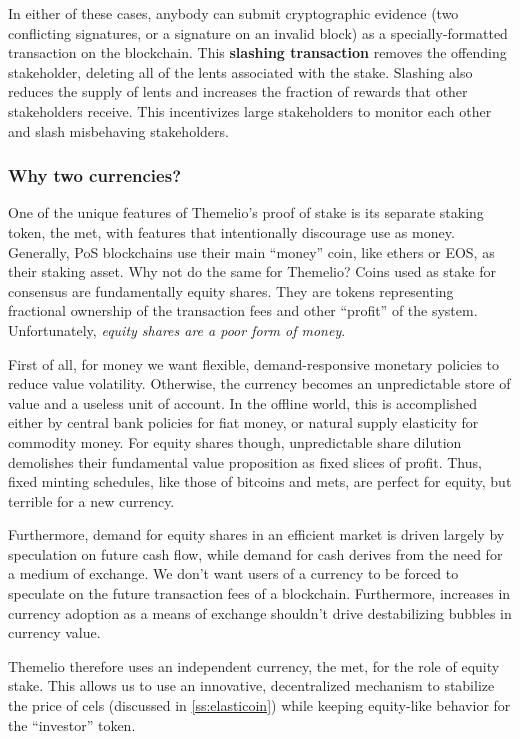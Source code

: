 \documentclass[headinclude]{scrbook}
\begin{document}
In either of these cases, anybody can submit cryptographic evidence (two conflicting signatures, or a signature on an invalid block) as a specially-formatted transaction on the blockchain. This \textbf{slashing transaction} removes the offending stakeholder, deleting all of the lents associated with the stake. Slashing also reduces the supply of lents and increases the fraction of rewards that other stakeholders receive. This incentivizes large stakeholders to monitor each other and slash misbehaving stakeholders.

\subsubsection{Why two currencies?}

One of the unique features of Themelio's proof of stake is its separate staking token, the met, with features that intentionally discourage use as money. Generally, PoS blockchains use their main ``money'' coin, like ethers or EOS, as their staking asset. Why not do the same for Themelio? Coins used as stake for consensus are fundamentally equity shares. They are tokens representing fractional ownership of the transaction fees and other ``profit'' of the system. Unfortunately, \emph{equity shares are a poor form of money}.

First of all, for money we want flexible, demand-responsive monetary policies to reduce value volatility. Otherwise, the currency becomes an unpredictable store of value and a useless unit of account. In the offline world, this is accomplished either by central bank policies for fiat money, or natural supply elasticity for commodity money. For equity shares though, unpredictable share dilution demolishes their fundamental value proposition as fixed slices of profit. Thus, fixed minting schedules, like those of bitcoins and mets, are perfect for equity, but terrible for a new currency.

Furthermore, demand for equity shares in an efficient market is driven largely by speculation on future cash flow, while demand for cash derives from the need for a medium of exchange. We don't want users of a currency to be forced to speculate on the future transaction fees of a blockchain. Furthermore, increases in currency adoption as a means of exchange shouldn't drive destabilizing bubbles in currency value.

Themelio therefore uses an independent currency, the met, for the role of equity stake. This allows us to use an innovative, decentralized mechanism to stabilize the price of cels (discussed in \ref{ss:elasticoin}) while keeping equity-like behavior for the ``investor'' token.
\end{document}
